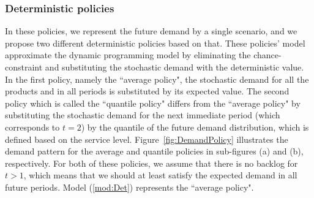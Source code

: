 \documentclass[11pt]{article}
\newcommand{\ti}{t} %
\begin{document}
  
\subsubsection{Deterministic policies}

In these policies, we represent the future demand by a single scenario, and we propose two different deterministic policies based on that. 
These policies' model approximate the dynamic programming model
by eliminating the chance-constraint and substituting the stochastic demand  with the deterministic value.
In the first policy, namely the ``average policy", the stochastic demand for all the products and in all periods is substituted by its expected value. The second policy which is called the ``quantile policy" differs from the ``average policy" by substituting the stochastic demand for the next immediate period (which corresponds to $\ti =2$) by the quantile of the future demand distribution, which is defined based on the service level. Figure~\ref{fig:DemandPolicy} illustrates the demand pattern for the average and quantile policies in sub-figures (a) and (b), respectively. For both of these policies, we assume that there is no backlog for $\ti > 1$, which means that we should at least satisfy the expected demand in all future periods.
Model (\ref{mod:Det}) represents the ``average policy".
\end{document}
